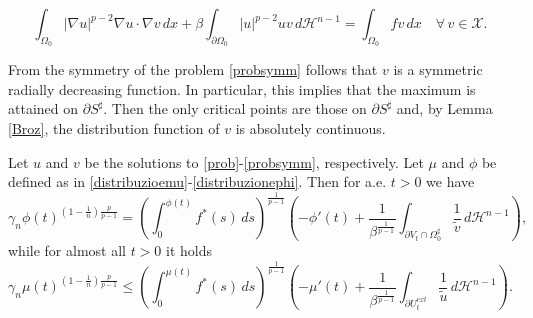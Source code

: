 \documentclass[10pt,a4paper]{amsart}
\newcommand{\abs}[1]{{\left|#1\right|}}
\newcommand{\dH}{d\mathcal{H}^{n-1}}
\begin{document}
    \begin{equation}\label{eqdebole}
        \int_{\Omega_0}\abs{\nabla u}^{p-2}\nabla u\cdot\nabla v\,dx+\beta\int_{\partial\Omega_0}\abs{u}^{p-2}uv\,\dH=\int_{\Omega_0} fv\,dx\quad\forall\,v\in\mathcal{X}.
    \end{equation}

\begin{oss}\label{brotherziemer}
    From the symmetry of the problem \eqref{probsymm} follows that $v$ is a symmetric radially decreasing function. In particular, this implies that the maximum is attained on $\partial S^\sharp$. Then the only critical points are those on $\partial S^\sharp$ and,
    by Lemma \ref{Broz}, the distribution function of $v$ is absolutely continuous. 
\end{oss}

\begin{lemma}
    Let $u$ and $v$ be the solutions to \eqref{prob}-\eqref{probsymm}, respectively. Let $\mu$ and $\phi$ be defined as in \eqref{distribuzioemu}-\eqref{distribuzionephi}. Then for a.e. $t>0$ we have
    \begin{equation}\label{compsymm}
        \gamma_n\phi(t)^{\left(1-\frac{1}{n}\right)\frac{p}{p-1}}=\left(\int_0^{\phi(t)}f^\ast(s)\,ds\right)^\frac{1}{p-1}\left(- \phi'(t)+\frac{1}{\beta^\frac{1}{p-1}}\int_{\partial V_t\cap\Omega_0^\sharp}\frac{1}{\tilde v}\,d\mathcal{H}^{n-1}\right),
    \end{equation}
    while for almost all $t>0$ it holds
    \begin{equation}\label{comp}
        \gamma_n\mu(t)^{\left(1-\frac{1}{n}\right)\frac{p}{p-1}}\leq\left(\int_0^{\mu(t)}f^\ast(s)\,ds\right)^\frac{1}{p-1}\left(- \mu'(t)+\frac{1}{\beta^\frac{1}{p-1}}\int_{\partial U^{ext}_t}\frac{1}{\tilde u}\,d\mathcal{H}^{n-1}\right).
    \end{equation}
\end{lemma}
\end{document}
